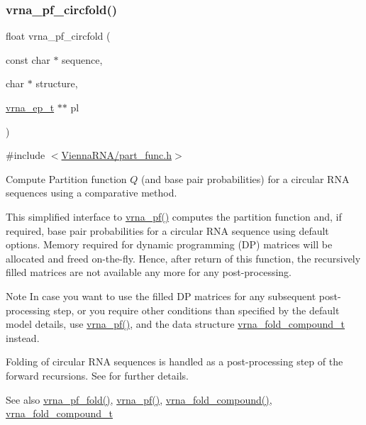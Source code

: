 \subsubsection{\texorpdfstring{vrna\_pf\_circfold()}{vrna\_pf\_circfold()}}
{\footnotesize\ttfamily float vrna\+\_\+pf\+\_\+circfold (\begin{DoxyParamCaption}\item[{const char $\ast$}]{sequence,  }\item[{char $\ast$}]{structure,  }\item[{\mbox{\hyperlink{group__struct__utils__plist_gab9ac98ab55ded9fb90043b024b915aca}{vrna\+\_\+ep\+\_\+t}} $\ast$$\ast$}]{pl }\end{DoxyParamCaption})}



{\ttfamily \#include $<$\mbox{\hyperlink{part__func_8h}{Vienna\+R\+N\+A/part\+\_\+func.\+h}}$>$}



Compute Partition function $Q$ (and base pair probabilities) for a circular R\+NA sequences using a comparative method. 

This simplified interface to \mbox{\hyperlink{group__part__func__global_ga29e256d688ad221b78d37f427e0e99bc}{vrna\+\_\+pf()}} computes the partition function and, if required, base pair probabilities for a circular R\+NA sequence using default options. Memory required for dynamic programming (DP) matrices will be allocated and free\textquotesingle{}d on-\/the-\/fly. Hence, after return of this function, the recursively filled matrices are not available any more for any post-\/processing.

\begin{DoxyNote}{Note}
In case you want to use the filled DP matrices for any subsequent post-\/processing step, or you require other conditions than specified by the default model details, use \mbox{\hyperlink{group__part__func__global_ga29e256d688ad221b78d37f427e0e99bc}{vrna\+\_\+pf()}}, and the data structure \mbox{\hyperlink{group__fold__compound_ga1b0cef17fd40466cef5968eaeeff6166}{vrna\+\_\+fold\+\_\+compound\+\_\+t}} instead.
\end{DoxyNote}
Folding of circular R\+NA sequences is handled as a post-\/processing step of the forward recursions. See \cite{hofacker:2006} for further details.

\begin{DoxySeeAlso}{See also}
\mbox{\hyperlink{group__part__func__global_gac4a2a74a79e49818bc35412a2b392c7e}{vrna\+\_\+pf\+\_\+fold()}}, \mbox{\hyperlink{group__part__func__global_ga29e256d688ad221b78d37f427e0e99bc}{vrna\+\_\+pf()}}, \mbox{\hyperlink{group__fold__compound_ga6601d994ba32b11511b36f68b08403be}{vrna\+\_\+fold\+\_\+compound()}}, \mbox{\hyperlink{group__fold__compound_ga1b0cef17fd40466cef5968eaeeff6166}{vrna\+\_\+fold\+\_\+compound\+\_\+t}}
\end{DoxySeeAlso}

